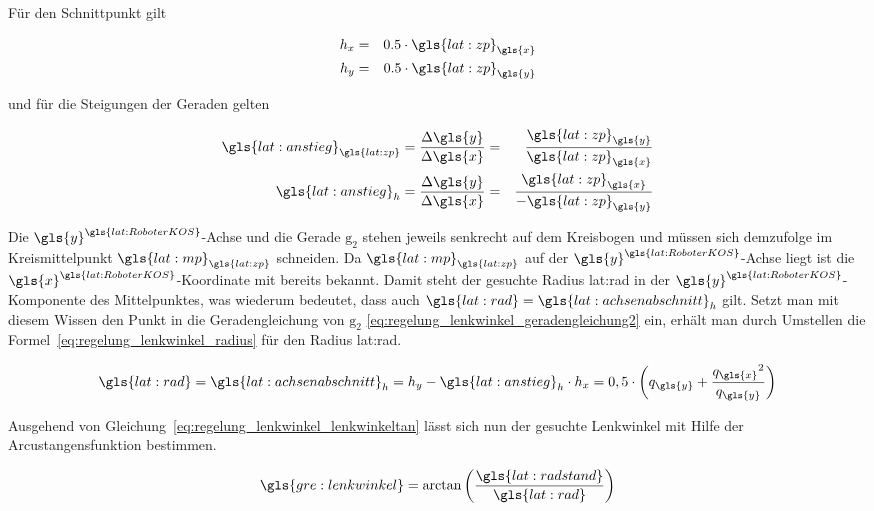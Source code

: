 Für den Schnittpunkt  gilt

\begin{eqnarray}
h_x & = & 0.5 \cdot {\gls{lat:zp}}_{\gls{x}} 	\\
h_y & = & 0.5 \cdot {\gls{lat:zp}}_{\gls{y}}
\end{eqnarray}

und für die Steigungen der Geraden gelten

\begin{eqnarray}
 {\gls{lat:anstieg}}_{\gls{lat:zp}} = \frac{\Delta \gls{y}}{\Delta \gls{x}} & = & \frac{{\gls{lat:zp}}_{\gls{y}}}{{\gls{lat:zp}}_{\gls{x}}} 	\\
 {\gls{lat:anstieg}}_h = \frac{\Delta \gls{y}}{\Delta \gls{x}} & = & \frac{{\gls{lat:zp}}_{\gls{x}}}{-{\gls{lat:zp}}_{\gls{y}}}
\end{eqnarray}

Die \( {\gls{y}}^{\gls{lat:RoboterKOS}} \)-Achse und die Gerade \( \mathrm{g_2} \) stehen jeweils senkrecht auf dem Kreisbogen und müssen sich demzufolge im Kreismittelpunkt \( {\gls{lat:mp}}_{\gls{lat:zp}} \) schneiden. Da \( {\gls{lat:mp}}_{\gls{lat:zp}} \) auf der \( {\gls{y}}^{\gls{lat:RoboterKOS}} \)-Achse liegt ist die \( {\gls{x}}^{\gls{lat:RoboterKOS}} \)-Koordinate mit \grqq{} bereits bekannt. Damit steht der gesuchte Radius \gls{lat:rad} in der \( {\gls{y}}^{\gls{lat:RoboterKOS}} \)-Komponente des Mittelpunktes, was wiederum bedeutet, dass auch \( \gls{lat:rad} = {\gls{lat:achsenabschnitt}}_h \) gilt. Setzt man mit diesem Wissen den Punkt  in die Geradengleichung von \( \mathrm{g_2} \) \eqref{eq:regelung_lenkwinkel_geradengleichung2} ein, erhält man durch Umstellen die Formel~\eqref{eq:regelung_lenkwinkel_radius} für den Radius \gls{lat:rad}.

\begin{equation}
\gls{lat:rad} = {\gls{lat:achsenabschnitt}}_h = h_y - {\gls{lat:anstieg}}_h \cdot h_x = 0,5 \cdot \left( {q}_{\gls{y}} + \frac{{q_{\gls{x}}}^2}{q_{\gls{y}}} \right)
\label{eq:regelung_lenkwinkel_radius}
\end{equation}

Ausgehend von Gleichung~\eqref{eq:regelung_lenkwinkel_lenkwinkeltan} lässt sich nun der gesuchte Lenkwinkel mit Hilfe der Arcustangensfunktion bestimmen.

\begin{equation}
\gls{gre:lenkwinkel} = \arctan \left( \frac{\gls{lat:radstand}}{\gls{lat:rad}} \right)
\end{equation}